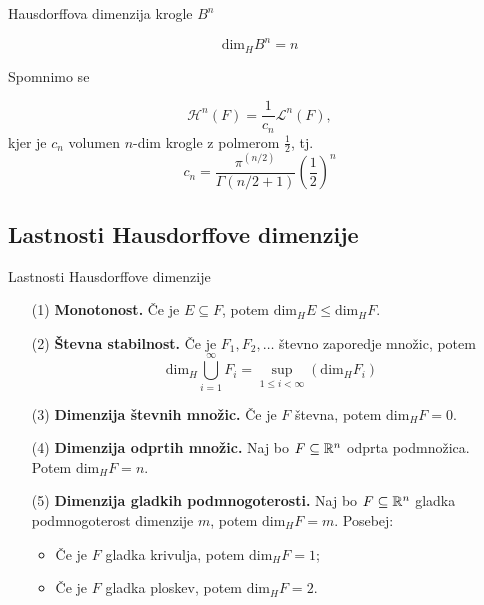 \documentclass[10pt]{beamer}
\begin{document}
\begin{frame}[t]{Hausdorffova dimenzija krogle \(B^n\)}
    \begin{lema}
        \[\text{dim}_H B^n = n\]
    \end{lema}
    
    \pause
    Spomnimo se
    \begin{lema}
        \[\mathcal{H}^n(F) = \frac{1}{c_n} \mathcal{L}^n(F),\]
        kjer je \(c_n\) volumen \(n\)-dim krogle z polmerom \(\frac{1}{2}\), tj. 
        \[c_n = \frac{\pi^{(n/2)}}{\Gamma(n/2 + 1)} \left(\frac{1}{2}\right)^n\]
    \end{lema}
\end{frame}

\subsection{Lastnosti Hausdorffove dimenzije}
\begin{frame}[t]{Lastnosti Hausdorffove dimenzije}
    \begin{itemize}
        \item[(1)] \textbf{Monotonost.} Če je \(E \subseteq F\), potem \(\text{dim}_H E \leq \text{dim}_H F\).
        \pause
        \item[(2)] \textbf{Števna stabilnost.} Če je \(F_1, F_2, \ldots\) števno zaporedje množic, potem 
        \[\text{dim}_H \bigcup_{i=1}^\infty F_i = \sup_{1 \leq i < \infty} (\text{dim}_H F_i)\]
        \pause
        \item[(3)] \textbf{Dimenzija števnih množic.} Če je \(F\) števna, potem \(\text{dim}_H F = 0\).
        \pause
        \item[(4)] \textbf{Dimenzija odprtih množic.} Naj bo \(F \subseteq \mathbb{R}^n\) odprta podmnožica. Potem \(\text{dim}_H F = n\).
        \pause
        \item[(5)] \textbf{Dimenzija gladkih podmnogoterosti.} Naj bo \(F \subseteq \mathbb{R}^n\) gladka podmnogoterost dimenzije \(m\), potem \(\text{dim}_H F = m\). Posebej:
        \begin{itemize}
            \item Če je \(F\) gladka krivulja, potem \(\text{dim}_H F = 1\);
            \item Če je \(F\) gladka ploskev, potem \(\text{dim}_H F = 2\).
        \end{itemize}
    \end{itemize}
\end{frame}

\end{document}

